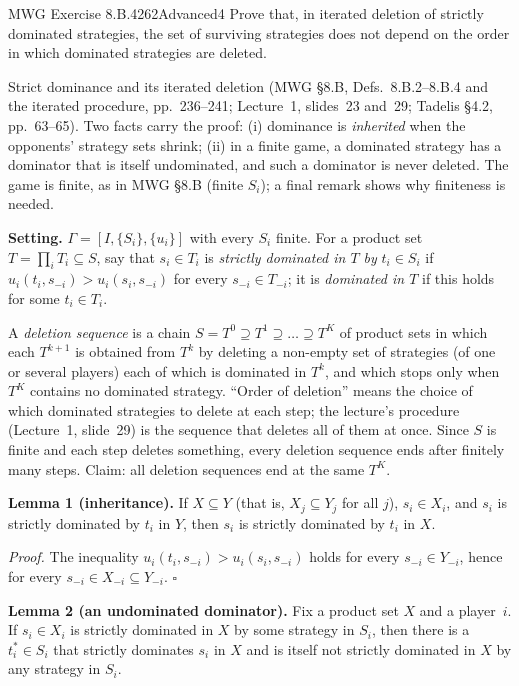 \begin{exsol}{MWG Exercise 8.B.4}{262}{Advanced}{4}
\asked Prove that, in iterated deletion of strictly dominated strategies, the set of surviving
strategies does not depend on the order in which dominated strategies are deleted.

\method Strict dominance and its iterated deletion (MWG \S8.B, Defs.~8.B.2--8.B.4 and the
iterated procedure, pp.~236--241; Lecture~1, slides~23 and~29; Tadelis \S4.2, pp.~63--65). Two
facts carry the proof: (i) dominance is \emph{inherited} when the opponents' strategy sets shrink;
(ii) in a finite game, a dominated strategy has a dominator that is itself undominated, and such a
dominator is never deleted. The game is finite, as in MWG \S8.B (finite $S_i$); a final remark
shows why finiteness is needed.

\solution
\textbf{Setting.} $\Gamma = [I, \{S_i\}, \{u_i\}]$ with every $S_i$ finite. For a product set
$T = \prod_i T_i \subseteq S$, say that $s_i \in T_i$ is \emph{strictly dominated in $T$ by}
$t_i \in S_i$ if $u_i(t_i, s_{-i}) > u_i(s_i, s_{-i})$ for every $s_{-i} \in T_{-i}$; it is
\emph{dominated in $T$} if this holds for some $t_i \in T_i$.

A \emph{deletion sequence} is a chain $S = T^0 \supseteq T^1 \supseteq \dots \supseteq T^K$ of
product sets in which each $T^{k+1}$ is obtained from $T^k$ by deleting a non-empty set of
strategies (of one or several players) each of which is dominated in $T^k$, and which stops only
when $T^K$ contains no dominated strategy. ``Order of deletion'' means the choice of which
dominated strategies to delete at each step; the lecture's procedure (Lecture~1, slide~29) is the
sequence that deletes all of them at once. Since $S$ is finite and each step deletes something,
every deletion sequence ends after finitely many steps. Claim: all deletion sequences end at the
same $T^K$.

\textbf{Lemma 1 (inheritance).} If $X \subseteq Y$ (that is, $X_j \subseteq Y_j$ for all $j$),
$s_i \in X_i$, and $s_i$ is strictly dominated by $t_i$ in $Y$, then $s_i$ is strictly dominated
by $t_i$ in $X$.

\emph{Proof.} The inequality $u_i(t_i, s_{-i}) > u_i(s_i, s_{-i})$ holds for every
$s_{-i} \in Y_{-i}$, hence for every $s_{-i} \in X_{-i} \subseteq Y_{-i}$. $\square$

\textbf{Lemma 2 (an undominated dominator).} Fix a product set $X$ and a player~$i$. If
$s_i \in X_i$ is strictly dominated in $X$ by some strategy in $S_i$, then there is a $t_i^* \in
S_i$ that strictly dominates $s_i$ in $X$ and is itself not strictly dominated in $X$ by any
strategy in $S_i$.


\end{exsol}
